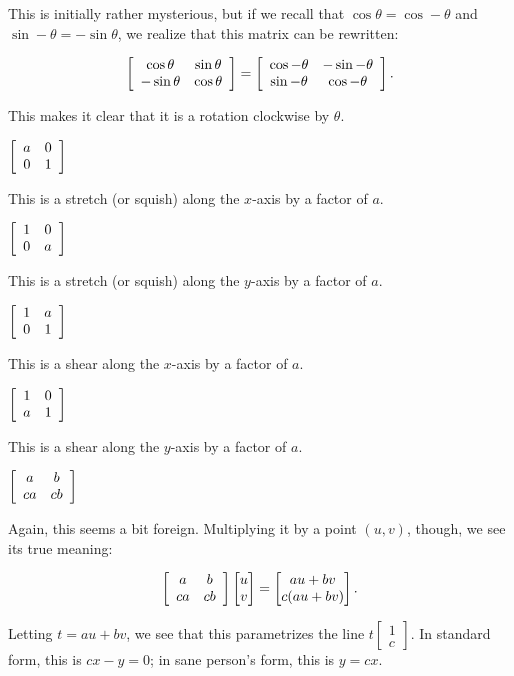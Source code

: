 \documentclass[../key.tex]{subfiles}
\begin{document}
This is initially rather mysterious, but if we recall that $\cos\theta = \cos-\theta$ and $\sin-\theta = -\sin\theta$, we realize that this matrix can be rewritten:

$$\left[\begin{array}{cc} \cos\theta & \sin\theta \\ -\sin\theta & \cos\theta \end{array}\right]= \left[\begin{array}{cc} \cos-\theta & -\sin-\theta \\ \sin-\theta & \cos-\theta \end{array}\right].$$

This makes it clear that it is a rotation clockwise by $\theta$.

\begin{inner_problem}
\item $\left[\begin{array}{cc} a & 0 \\ 0 & 1 \end{array}\right]$
\end{inner_problem}

This is a stretch (or squish) along the $x$-axis by a factor of $a$.

\begin{inner_problem}
\item $\left[\begin{array}{cc} 1 & 0 \\ 0 & a \end{array}\right]$
\end{inner_problem}

This is a stretch (or squish) along the $y$-axis by a factor of $a$.

\begin{inner_problem}
\item $\left[\begin{array}{cc} 1 & a \\ 0 & 1 \end{array}\right]$
\end{inner_problem}

This is a shear along the $x$-axis by a factor of $a$.

\begin{inner_problem}
\item $\left[\begin{array}{cc} 1 & 0 \\ a & 1 \end{array}\right]$
\end{inner_problem}

This is a shear along the $y$-axis by a factor of $a$.

\begin{inner_problem}
\item $\left[\begin{array}{cc} a & b \\ ca & cb \end{array}\right]$
\end{inner_problem}

Again, this seems a bit foreign. Multiplying it by a point $(u,v)$, though, we see its true meaning:

$$\left[\begin{array}{cc} a & b \\ ca & cb \end{array}\right]\begin{bmatrix} u \\ v \end{bmatrix} = \begin{bmatrix} au+bv \\ c(au+bv) \end{bmatrix}.$$

Letting $t=au+bv$, we see that this parametrizes the line $t\begin{bmatrix}1 \\ c \end{bmatrix}$. In standard form, this is $cx-y=0$; in sane person's form, this is $y = cx$.
\end{document}
